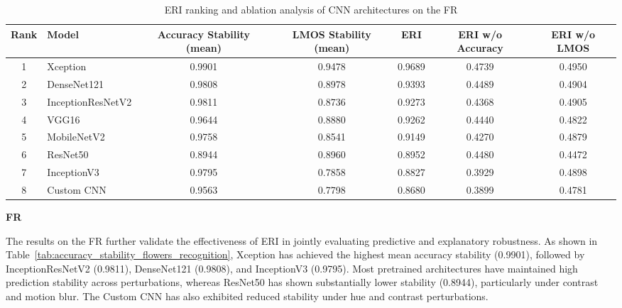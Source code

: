 \documentclass[a4paper,fleqn]{cas-dc}
\begin{document}
\begin{table}[t]
\centering
\caption{ERI ranking and ablation analysis of CNN architectures on the FR}
\label{tab:eri_ablation_ranking_flowers_recognition}

\scriptsize
\setlength{\tabcolsep}{5pt}
\renewcommand{\arraystretch}{1.15}

\begin{tabular}{|c|l|c|c|c|c|c|}
\hline
\textbf{Rank} &
\textbf{Model} &
\textbf{Accuracy Stability (mean)} &
\textbf{LMOS Stability (mean)} &
\textbf{ERI} &
\textbf{ERI w/o Accuracy} &
\textbf{ERI w/o LMOS} \\
\hline

1 & Xception
&0.9901&0.9478&0.9689&0.4739&0.4950\\

2 & DenseNet121
&0.9808&0.8978&0.9393&0.4489&0.4904\\

3 & InceptionResNetV2
&0.9811&0.8736&0.9273&0.4368&0.4905\\

4 & VGG16
&0.9644&0.8880&0.9262&0.4440&0.4822\\

5 & MobileNetV2
&0.9758&0.8541&0.9149&0.4270&0.4879\\

6 & ResNet50
&0.8944&0.8960&0.8952&0.4480&0.4472\\

7 & InceptionV3
&0.9795&0.7858&0.8827&0.3929&0.4898\\

8 & Custom CNN
&0.9563&0.7798&0.8680&0.3899&0.4781\\

\hline
\end{tabular}
\end{table}


\noindent\textbf{FR}

The results on the FR further validate the effectiveness of ERI in jointly evaluating predictive and explanatory robustness. As shown in Table~\ref{tab:accuracy_stability_flowers_recognition}, Xception has achieved the highest mean accuracy stability (0.9901), followed by InceptionResNetV2 (0.9811), DenseNet121 (0.9808), and InceptionV3 (0.9795). Most pretrained architectures have maintained high prediction stability across perturbations, whereas ResNet50 has shown substantially lower stability (0.8944), particularly under contrast and motion blur. The Custom CNN has also exhibited reduced stability under hue and contrast perturbations.
\end{document}
